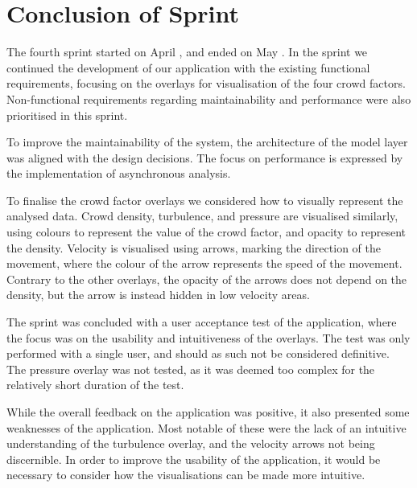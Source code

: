 \section{Conclusion of Sprint} \label{sec:s4_conclusion}
The fourth sprint started on April , and ended on May . In the sprint we continued the development of our application with the existing functional requirements, focusing on the overlays for visualisation of the four crowd factors. Non-functional requirements regarding maintainability and performance were also prioritised in this sprint.

To improve the maintainability of the system, the architecture of the model layer was aligned with the design decisions. The focus on performance is expressed by the implementation of asynchronous analysis.

To finalise the crowd factor overlays we considered how to visually represent the analysed data. Crowd density, turbulence, and pressure are visualised similarly, using colours to represent the value of the crowd factor, and opacity to represent the density. Velocity is visualised using arrows, marking the direction of the movement, where the colour of the arrow represents the speed of the movement. Contrary to the other overlays, the opacity of the arrows does not depend on the density, but the arrow is instead hidden in low velocity areas.

The sprint was concluded with a user acceptance test of the application, where the focus was on the usability and intuitiveness of the overlays. The test was only performed with a single user, and should as such not be considered definitive. The pressure overlay was not tested, as it was deemed too complex for the relatively short duration of the test.

While the overall feedback on the application was positive, it also presented some weaknesses of the application. Most notable of these were the lack of an intuitive understanding of the turbulence overlay, and the velocity arrows not being discernible. In order to improve the usability of the application, it would be necessary to consider how the visualisations can be made more intuitive.

